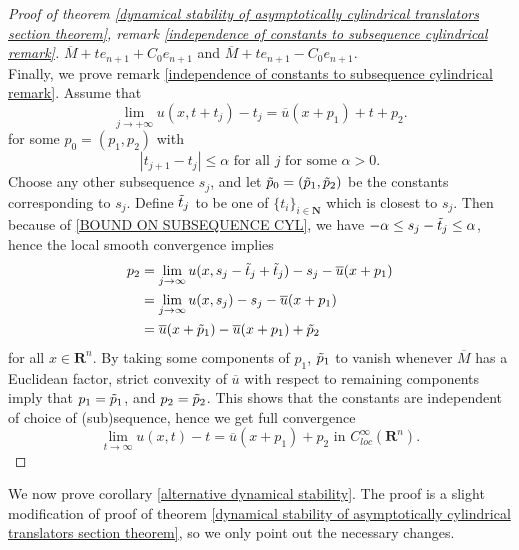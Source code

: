 \documentclass[pdflatex,sn-mathphys-num]{sn-jnl}%
\begin{document}
\begin{proof}[Proof of theorem \ref{dynamical stability of asymptotically cylindrical translators section theorem}, remark \ref{independence of constants to subsequence cylindrical remark}]
$\overline{M} + te_{n+1} + C_0e_{n+1}$ and $\overline{M} + te_{n+1} - C_0e_{n+1}$.\\

Finally, we prove remark \ref{independence of constants to subsequence cylindrical remark}. Assume that 
\begin{equation}
    \lim_{j \to +\infty}u(x, t + t_j) - t_j = \overline{u}(x + p_1) + t + p_2.
\end{equation}
for some $p_0 = (p_1, p_2)$ with 
\begin{equation}\label{BOUND ON SUBSEQUENCE CYL}
    |t_{j+1} - t_j| \leq \alpha \text{ for all }j\text{ for some }\alpha > 0.
\end{equation}
Choose any other subsequence $s_j$, and let $\Tilde{p}_0 = (\Tilde{p}_1, \Tilde{p}_2)$ be the constants corresponding to $s_j$. Define $\Tilde{t}_j$ to be one of $\{t_i\}_{i \in \mathbf{N}}$ which is closest to $s_j$. Then because of \eqref{BOUND ON SUBSEQUENCE CYL}, we have $-\alpha \leq s_j - \Tilde{t}_j \leq \alpha$, hence the local smooth convergence implies 
\begin{align*}
     p_2 &= \lim_{j \to \infty}u(x, s_j-\Tilde{t}_j + \Tilde{t}_j) - s_j - \overline{u}(x + p_1) \\& = \lim_{j \to \infty}u(x, s_j) - s_j - \overline{u}(x + p_1) \\ & = \overline{u}(x + \Tilde{p}_1) - \overline{u}(x+p_1) + \Tilde{p}_2
\end{align*}
for all $x \in \mathbf{R}^n$. By taking some components of $p_1$, $\Tilde{p}_1$ to vanish whenever $\overline{M}$ has a Euclidean factor, strict convexity of $\overline{u}$ with respect to remaining components imply that $p_1 = \Tilde{p}_1$, and $p_2 = \Tilde{p}_2$. This shows that the constants are independent of choice of (sub)sequence, hence we get full convergence
\begin{equation}
    \lim_{t \to \infty}u(x, t) - t= \overline{u}(x + p_1) + p_2 \text{ in }C^{\infty}_{loc}(\mathbf{R}^n).
\end{equation}
\end{proof}
We now prove corollary \ref{alternative dynamical stability}. The proof is a slight modification of proof of theorem \ref{dynamical stability of asymptotically cylindrical translators section theorem}, so we only point out the necessary changes.
\end{document}
